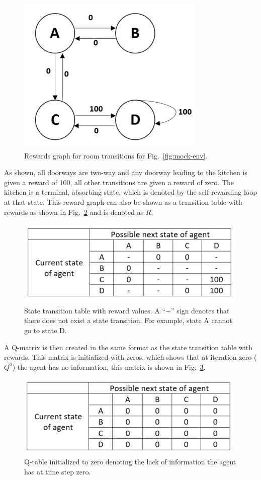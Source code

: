 \documentclass[12pt,american]{report}
\begin{document}
\begin{figure}
\centering
\includegraphics[scale=1]{images/mock-env-rewards.png}
\caption{Rewards graph for room transitions for Fig.~\ref{fig:mock-env}.}
\label{fig:mock-env-rewards}
\end{figure}
As shown, all doorways are two-way and any doorway leading to the kitchen is given a reward of 100, all other transitions are given a reward of zero.  The kitchen is a terminal, absorbing state, which is denoted by the self-rewarding loop at that state.  This reward graph can also be shown as a transition table with rewards as shown in Fig.~\ref{fig:q-mock-env-table} and is denoted as $R$. 
\begin{figure}
\centering
\includegraphics[scale=1.5]{images/q-mock-env-table.png}
\caption{State transition table with reward values. A ``$-$'' sign denotes that there does not exist a state transition. For example, state A cannot go to state D.}
\label{fig:q-mock-env-table}
\end{figure}
A Q-matrix is then created in the same format as the state transition table with rewards.  This matrix is initialized with zeros, which shows that at iteration zero ($Q^{0}$) the agent has no information, this matrix is shown in Fig.~\ref{fig:mock-q-table}.
\begin{figure}
\centering
\includegraphics[scale=1.5]{images/mock-q-table.png}
\caption{Q-table initialized to zero denoting the lack of information the agent has at time step zero.}
\label{fig:mock-q-table}
\end{figure}
\end{document}
